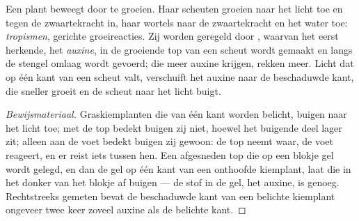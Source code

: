 \begin{proposition}\label{prop:g12:plant-rooted-life:tropisms}
Een plant beweegt door te groeien. Haar scheuten groeien naar het licht
toe en tegen de zwaartekracht in, haar wortels naar de zwaartekracht en
het water toe: \emph{tropismen}, gerichte
groeireacties. Zij worden geregeld door , waarvan het eerst
herkende, het \emph{auxine}, in de groeiende top van een scheut wordt
gemaakt en langs de stengel omlaag wordt gevoerd;  die meer auxine
krijgen, rekken meer. Licht dat op één kant van een scheut valt,
verschuift het auxine naar de beschaduwde kant, die sneller groeit en de
scheut naar het licht buigt.
\end{proposition}
\begin{proof}[Bewijsmateriaal]
Graskiemplanten die van één kant worden belicht, buigen naar het licht
toe; met de top bedekt buigen zij niet, hoewel het buigende deel lager
zit; alleen aan de voet bedekt buigen zij gewoon: de top neemt waar, de
voet reageert, en er reist iets tussen hen. Een afgesneden top die op een
blokje gel wordt gelegd, en dan de gel op één kant van een onthoofde
kiemplant, laat die in het donker van het blokje af buigen --- de stof in
de gel, het auxine, is genoeg. Rechtstreeks gemeten bevat de beschaduwde
kant van een belichte kiemplant ongeveer twee keer zoveel auxine als de
belichte kant.
\end{proof}

